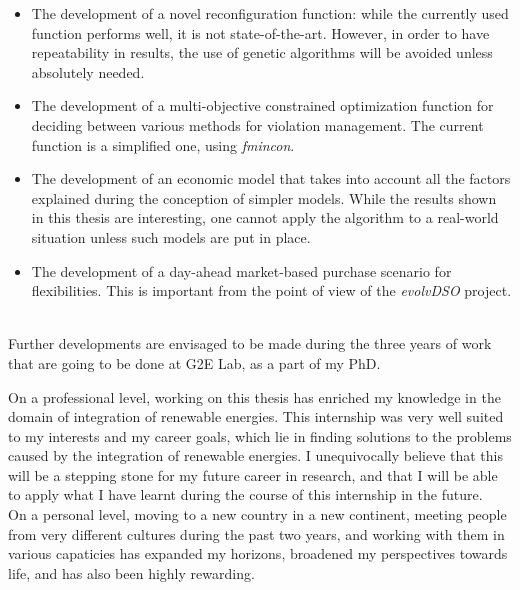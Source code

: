 \begin{itemize}

\item The development of a novel reconfiguration function: while the currently used function performs well, it is not state-of-the-art. However, in order to have repeatability in results, the use of genetic algorithms will be avoided unless absolutely needed.\\

\item The development of a multi-objective constrained optimization function for deciding between various methods for violation management. The current function is a simplified one, using \emph{fmincon}.\\

\item The development of an economic model that takes into account all the factors explained during the conception of simpler models. While the results shown in this thesis are interesting, one cannot apply the algorithm to a real-world situation unless such models are put in place.\\

\item The development of a day-ahead market-based purchase scenario for flexibilities. This is important from the point of view of the \emph{evolvDSO} project.

\end{itemize}
\ \\
Further developments are envisaged to be made during the three years of work that are going to be done at G2E Lab, as a part of my PhD.\\
\newpage

On a professional level, working on this thesis has enriched my knowledge in the domain of integration of renewable energies. This internship was very well suited to my interests and my career goals, which lie in finding solutions to the problems caused by the integration of renewable energies. I unequivocally believe that this will be a stepping stone for my future career in research, and that I will be able to apply what I have learnt during the course of this internship in the future.\\

On a personal level, moving to a new country in a new continent, meeting people from very different cultures during the past two years, and working with them in various capaticies has expanded my horizons, broadened my perspectives towards life, and has also been highly rewarding.